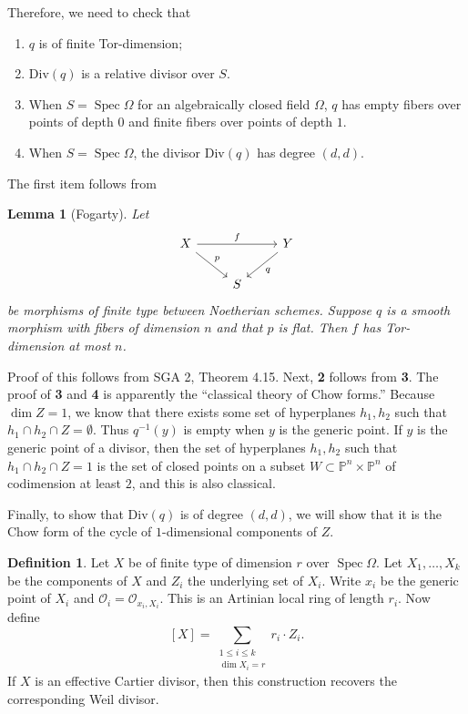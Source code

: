 \documentclass[leqno, openany]{memoir}
\newtheorem{lem}[thm]{Lemma}
\theoremstyle{definition}
\newtheorem{defn}[thm]{Definition}
\theoremstyle{remark}
\theoremstyle{plain}
\theoremstyle{definition}
\theoremstyle{remark}
\renewcommand{\P}{\mathbb{P}}
\newcommand{\mc}[1]{\mathcal{#1}}
\newcommand{\mr}[1]{\mathrm{#1}}
\DeclareMathOperator{\Spec}{Spec}
\begin{document}
Therefore, we need to check that
\begin{enumerate}
    \item $q$ is of finite Tor-dimension;
    \item $\mr{Div}(q)$ is a relative divisor over $S$.
    \item When $S = \Spec \Omega$ for an algebraically closed field $\Omega$, $q$ has empty fibers over points of depth $0$ and finite fibers over points of depth $1$.
    \item When $S = \Spec \Omega$, the divisor $\mr{Div}(q)$ has degree $(d,d)$.
\end{enumerate}
The first item follows from
\begin{lem}[Fogarty]
    Let 
    \begin{equation*}
    \begin{tikzcd}
        X \arrow{rr}{f} \arrow{dr}{p} & & Y \arrow{dl}{q} \\
                                      & S
    \end{tikzcd}
    \end{equation*}
    be morphisms of finite type between Noetherian schemes. Suppose $q$ is a smooth morphism with fibers of dimension $n$ and that $p$ is flat. Then $f$ has Tor-dimension at most $n$.
\end{lem}
Proof of this follows from SGA 2, Theorem 4.15. Next, \textbf{2} follows from \textbf{3}. The proof of \textbf{3} and \textbf{4} is apparently the ``classical theory of Chow forms.'' Because $\dim Z = 1$, we know that there exists some set of hyperplanes $h_1, h_2$ such that $h_1 \cap h_2 \cap Z = \emptyset$. Thus $q^{-1}(y)$ is empty when $y$ is the generic point. If $y$ is the generic point of a divisor, then the set of hyperplanes $h_1, h_2$ such that $h_1 \cap h_2 \cap Z = 1$ is the set of closed points on a subset $W \subset \P^n \times \P^n$ of codimension at least $2$, and this is also classical.

Finally, to show that $\mr{Div}(q)$ is of degree $(d,d)$, we will show that it is the Chow form of the cycle of $1$-dimensional components of $Z$.
\begin{defn}
    Let $X$ be of finite type of dimension $r$ over $\Spec \Omega$. Let $X_1, \ldots, X_k$ be the components of $X$ and $Z_i$ the underlying set of $X_i$. Write $x_i$ be the generic point of $X_i$ and $\mc{O}_i = \mc{O}_{x_i, X_i}$. This is an Artinian local ring of length $r_i$. Now define
    \[ [X] = \sum_{\substack{1 \leq i \leq k \\ \dim X_i = r}} r_i \cdot Z_i. \]
    If $X$ is an effective Cartier divisor, then this construction recovers the corresponding Weil divisor.
\end{defn}
\end{document}
